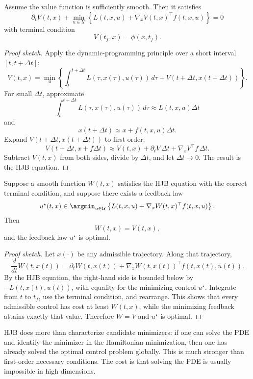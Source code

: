 \begin{theorem}\label{thm:l4-hamilton-jacobi-bellman-equation}
	Assume the value function is sufficiently smooth. Then it satisfies
	\[
		\partial_t V(t,x)
		+
		\min_{u \in \mathcal{U}}
		\left\{
			L(t,x,u)+\nabla_x V(t,x)^\top f(t,x,u)
		\right\}
		=0
	\]
	with terminal condition
	\[
		V(t_f,x)=\phi(x,t_f).
	\]
\end{theorem}
\begin{proof}[Proof sketch]
	Apply the dynamic-programming principle over a short interval $[t,t+\Delta t]$:
	\[
		V(t,x)=\min_u
		\left\{
			\int_t^{t+\Delta t}L(\tau,x(\tau),u(\tau))\,d\tau
			+
			V(t+\Delta t,x(t+\Delta t))
		\right\}.
	\]
	For small $\Delta t$, approximate
	\[
		\int_t^{t+\Delta t}L(\tau,x(\tau),u(\tau))\,d\tau
		\approx
		L(t,x,u)\Delta t
	\]
	and
	\[
		x(t+\Delta t)\approx x+f(t,x,u)\Delta t.
	\]
	Expand $V(t+\Delta t,x(t+\Delta t))$ to first order:
	\[
		V(t+\Delta t,x+f\Delta t)
		\approx
		V(t,x)+\partial_t V\,\Delta t+\nabla_x V^\top f\,\Delta t.
	\]
	Subtract $V(t,x)$ from both sides, divide by $\Delta t$, and let $\Delta t \to 0$. The result is the HJB equation.
\end{proof}

\begin{theorem}\label{thm:l4-verification-theorem}
	Suppose a smooth function $W(t,x)$ satisfies the HJB equation with the correct terminal condition, and suppose there exists a feedback law
	\[
		u^\star(t,x)\in \argmin_{u \in \mathcal{U}}
		\left\{
			L(t,x,u)+\nabla_x W(t,x)^\top f(t,x,u)
		\right\}.
	\]
	Then
	\[
		W(t,x)=V(t,x),
	\]
	and the feedback law $u^\star$ is optimal.
\end{theorem}
\begin{proof}[Proof sketch]
	Let $x(\cdot)$ be any admissible trajectory. Along that trajectory,
	\[
		\frac{d}{dt}W(t,x(t))
		=
		\partial_t W(t,x(t))+\nabla_x W(t,x(t))^\top f(t,x(t),u(t)).
	\]
	By the HJB equation, the right-hand side is bounded below by $-L(t,x(t),u(t))$, with equality for the minimizing control $u^\star$. Integrate from $t$ to $t_f$, use the terminal condition, and rearrange. This shows that every admissible control has cost at least $W(t,x)$, while the minimizing feedback attains exactly that value. Therefore $W=V$ and $u^\star$ is optimal.
\end{proof}

\begin{remark}
	HJB does more than characterize candidate minimizers: if one can solve the PDE and identify the minimizer in the Hamiltonian minimization, then one has already solved the optimal control problem globally. This is much stronger than first-order necessary conditions. The cost is that solving the PDE is usually impossible in high dimensions.
\end{remark}


